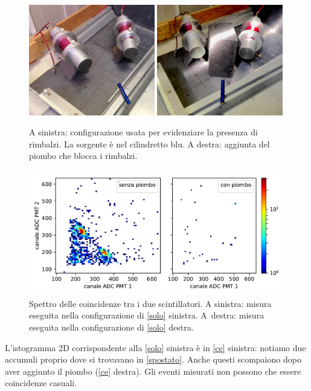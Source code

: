 \begin{figure}[h]
\centering
\subfloat
{\includegraphics[width=0.49\textwidth]{immagini/rimb.jpg}}
\hfill
\subfloat
{\includegraphics[width=0.49\textwidth]{immagini/norimb}}
\caption{\label{solo}
A sinistra:
configurazione usata per evidenziare la presenza di rimbalzi.
La sorgente è nel cilindretto blu.
A destra:
aggiunta del piombo che blocca i rimbalzi.}
\end{figure}

\begin{figure}[h]
\centering
\includegraphics[width=\textwidth]{immagini/rimb}
\caption{\label{ce}
Spettro delle coincidenze tra i due scintillatori.
A sinistra: misura eseguita nella configurazione di \autoref{solo} sinistra.
A~destra: misura eseguita nella configurazione di \autoref{solo} destra.}
\end{figure}

L'istogramma 2D corrispondente alla \autoref{solo} sinistra è in \autoref{ce} sinistra: notiamo due accumuli proprio dove si trovavano in \autoref{spostato}. Anche questi scompaiono dopo aver aggiunto il piombo (\autoref{ce} destra). Gli eventi misurati non possono che essere coincidenze casuali.

